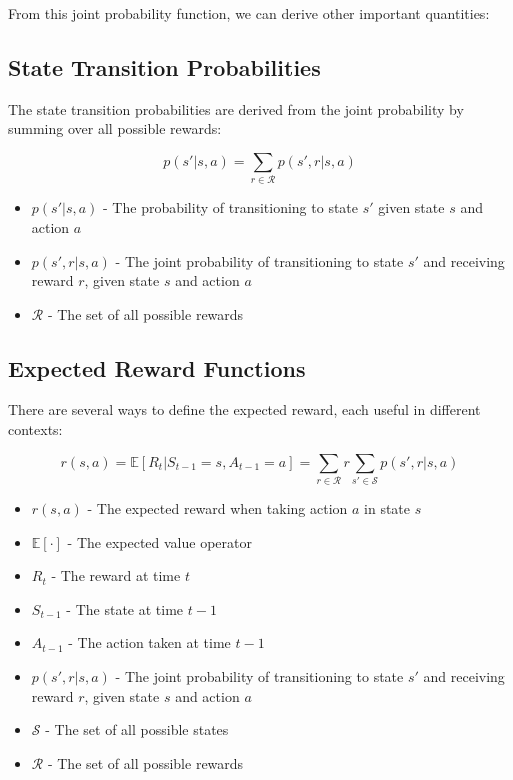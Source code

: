 \documentclass[12pt,a4paper]{article}
\begin{document}
From this joint probability function, we can derive other important quantities:

\subsection{State Transition Probabilities}

The state transition probabilities are derived from the joint probability by summing over all possible rewards:

\begin{equation}
p(s'|s,a) = \sum_{r \in \mathcal{R}} p(s',r|s,a)
\end{equation}

\begin{tcolorbox}[title=Notation Overview]
\begin{itemize}
    \item $p(s'|s,a)$ - The probability of transitioning to state $s'$ given state $s$ and action $a$
    \item $p(s',r|s,a)$ - The joint probability of transitioning to state $s'$ and receiving reward $r$, given state $s$ and action $a$
    \item $\mathcal{R}$ - The set of all possible rewards
\end{itemize}
\end{tcolorbox}

\subsection{Expected Reward Functions}

There are several ways to define the expected reward, each useful in different contexts:

\begin{equation}
r(s,a) = \mathbb{E}[R_t|S_{t-1}=s, A_{t-1}=a] = \sum_{r \in \mathcal{R}} r \sum_{s' \in \mathcal{S}} p(s',r|s,a)
\end{equation}

\begin{tcolorbox}[title=Notation Overview]
\begin{itemize}
    \item $r(s,a)$ - The expected reward when taking action $a$ in state $s$
    \item $\mathbb{E}[\cdot]$ - The expected value operator
    \item $R_t$ - The reward at time $t$
    \item $S_{t-1}$ - The state at time $t-1$
    \item $A_{t-1}$ - The action taken at time $t-1$
    \item $p(s',r|s,a)$ - The joint probability of transitioning to state $s'$ and receiving reward $r$, given state $s$ and action $a$
    \item $\mathcal{S}$ - The set of all possible states
    \item $\mathcal{R}$ - The set of all possible rewards
\end{itemize}
\end{tcolorbox}
\end{document}
